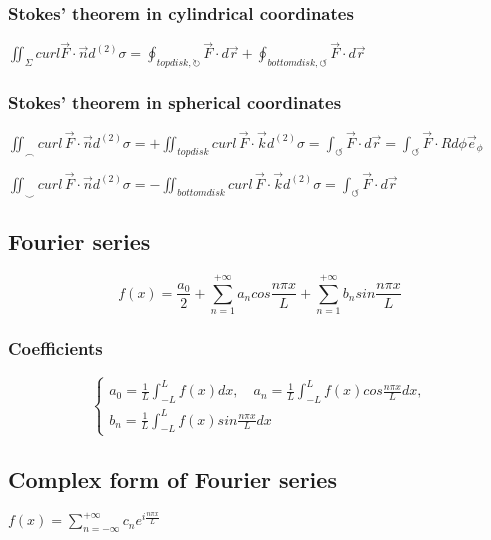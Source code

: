 \documentclass{article}
\begin{document}
\subsubsection{Stokes' theorem in cylindrical coordinates}
$\displaystyle\iint_\Sigma curl \vec{F}\cdot\vec{n}d^{(2)}\sigma = \displaystyle\oint_{topdisk, \circlearrowright}\vec{F}\cdot d\vec{r} + \displaystyle\oint_{bottomdisk, \circlearrowleft}\vec{F}\cdot d\vec{r}$

\subsubsection{Stokes' theorem in spherical coordinates}
$\displaystyle\iint_{\smallfrown}curl \,\vec{F}\cdot\vec{n}d^{(2)}\sigma = + \displaystyle\iint_{topdisk} curl\,\vec{F}\cdot\vec{k}d^{(2)}\sigma = \displaystyle\int_\circlearrowleft\vec{F}\cdot d\vec{r} = \displaystyle\int_\circlearrowleft\vec{F}\cdot Rd\phi\vec{e}_\phi$

\vspace{4pt}

\noindent$\displaystyle\iint_{\smallsmile}curl \,\vec{F}\cdot\vec{n}d^{(2)}\sigma = - \displaystyle\iint_{bottomdisk} curl\,\vec{F}\cdot\vec{k}d^{(2)}\sigma = \displaystyle\int_\circlearrowleft\vec{F}\cdot d\vec{r}$

\subsection{Fourier series}
\begin{equation}
f(x)=\frac{a_0}{2}+\displaystyle\sum_{n=1}^{+\infty}a_n cos\frac{n\pi x}{L} + \displaystyle\sum_{n=1}^{+\infty}b_nsin\frac{n\pi x}{L}
\end{equation}

\subsubsection{Coefficients}
\begin{equation}
\begin{cases}
    a_0=\frac{1}{L}\displaystyle\int_{-L}^{L}f(x)dx, \quad a_n=\frac{1}{L}\displaystyle\int_{-L}^{L}f(x)cos\frac{n\pi x}{L}dx, \\ b_n = \frac{1}{L}\displaystyle\int_{-L}^{L}f(x)sin\frac{n\pi x}{L} dx
    \end{cases}
\end{equation}

\subsection{Complex form of Fourier series}
\centerline{$f(x)=\displaystyle\sum_{n=-\infty}^{+\infty}c_ne^{i\frac{n\pi x}{L}}$}
\end{document}
